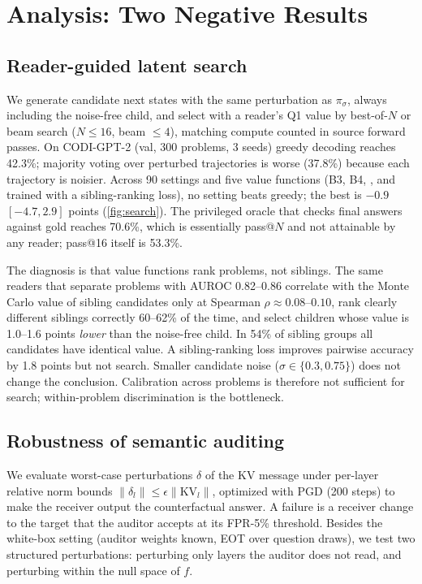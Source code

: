 \section{Analysis: Two Negative Results}
\label{sec:analysis}

\subsection{Reader-guided latent search}
\label{sec:search}
We generate candidate next states with the same perturbation as $\pi_\sigma$, always including the noise-free child, and select with a reader's Q1 value by best-of-$N$ or beam search ($N\le16$, beam $\le4$), matching compute counted in source forward passes. On CODI-GPT-2 (val, 300 problems, 3 seeds) greedy decoding reaches 42.3\%; majority voting over perturbed trajectories is worse (37.8\%) because each trajectory is noisier. Across 90 settings and five value functions (B3, B4, \clr{}, and \clr{} trained with a sibling-ranking loss), no setting beats greedy; the best is $-0.9$ $[-4.7, 2.9]$ points (\cref{fig:search}). The privileged oracle that checks final answers against gold reaches 70.6\%, which is essentially pass@$N$ and not attainable by any reader; pass@16 itself is 53.3\%.

The diagnosis is that value functions rank problems, not siblings. The same readers that separate problems with AUROC 0.82--0.86 correlate with the Monte Carlo value of sibling candidates only at Spearman $\rho\approx0.08$--$0.10$, rank clearly different siblings correctly 60--62\% of the time, and select children whose value is 1.0--1.6 points \emph{lower} than the noise-free child. In 54\% of sibling groups all candidates have identical value. A sibling-ranking loss improves pairwise accuracy by 1.8 points but not search. Smaller candidate noise ($\sigma\in\{0.3,0.75\}$) does not change the conclusion. Calibration across problems is therefore not sufficient for search; within-problem discrimination is the bottleneck.



\subsection{Robustness of semantic auditing}
\label{sec:robust}
We evaluate worst-case perturbations $\delta$ of the KV message under per-layer relative norm bounds $\|\delta_l\|\le\epsilon\|\mathrm{KV}_l\|$, optimized with PGD (200 steps) to make the receiver output the counterfactual answer. A failure is a receiver change to the target that the auditor accepts at its FPR-5\% threshold. Besides the white-box setting (auditor weights known, EOT over question draws), we test two structured perturbations: perturbing only layers the auditor does not read, and perturbing within the null space of $f$.

